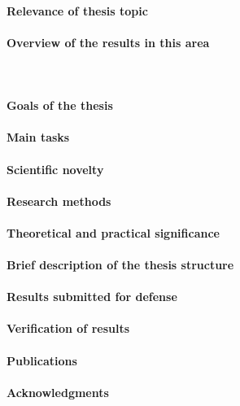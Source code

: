 \paragraph{Relevance of thesis topic}
\lipsum[1]

\paragraph{Overview of the results in this area}
\lipsum[1]~\cite{bib1}

\paragraph{Goals of the thesis}
\lipsum[1]

\paragraph{Main tasks}
\lipsum[1]


\paragraph{Scientific novelty}
\lipsum[1]

\paragraph{Research methods}
\lipsum[1]

\paragraph{Theoretical and practical significance}
\lipsum[1]

\paragraph{Brief description of the thesis structure}
\lipsum[1]

\paragraph{Results submitted for defense}
\lipsum[1]

\paragraph{Verification of results}
\lipsum[1]

\paragraph{Publications}
\lipsum[1]

\paragraph{Acknowledgments}
\lipsum[1]